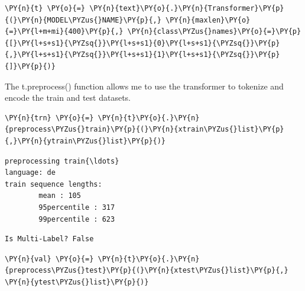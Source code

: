     \begin{tcolorbox}[breakable, size=fbox, boxrule=1pt, pad at break*=1mm,colback=cellbackground, colframe=cellborder]
\begin{Verbatim}[commandchars=\\\{\},fontsize=\footnotesize]
\PY{n}{t} \PY{o}{=} \PY{n}{text}\PY{o}{.}\PY{n}{Transformer}\PY{p}{(}\PY{n}{MODEL\PYZus{}NAME}\PY{p}{,} \PY{n}{maxlen}\PY{o}{=}\PY{l+m+mi}{400}\PY{p}{,} \PY{n}{class\PYZus{}names}\PY{o}{=}\PY{p}{[}\PY{l+s+s1}{\PYZsq{}}\PY{l+s+s1}{0}\PY{l+s+s1}{\PYZsq{}}\PY{p}{,}\PY{l+s+s1}{\PYZsq{}}\PY{l+s+s1}{1}\PY{l+s+s1}{\PYZsq{}}\PY{p}{]}\PY{p}{)}
\end{Verbatim}
\end{tcolorbox}

The t.preprocess() function allows me to use the transformer to tokenize and encode the train and test datasets.
    \begin{tcolorbox}[breakable, size=fbox, boxrule=1pt, pad at break*=1mm,colback=cellbackground, colframe=cellborder]
\begin{Verbatim}[commandchars=\\\{\},fontsize=\footnotesize]
\PY{n}{trn} \PY{o}{=} \PY{n}{t}\PY{o}{.}\PY{n}{preprocess\PYZus{}train}\PY{p}{(}\PY{n}{xtrain\PYZus{}list}\PY{p}{,}\PY{n}{ytrain\PYZus{}list}\PY{p}{)}
\end{Verbatim}
\end{tcolorbox}

    \begin{Verbatim}[commandchars=\\\{\},fontsize=\footnotesize]
preprocessing train{\ldots}
language: de
train sequence lengths:
        mean : 105
        95percentile : 317
        99percentile : 623
    \end{Verbatim}

    \begin{Verbatim}[commandchars=\\\{\},fontsize=\footnotesize]
Is Multi-Label? False
    \end{Verbatim}

    \begin{tcolorbox}[breakable, size=fbox, boxrule=1pt, pad at break*=1mm,colback=cellbackground, colframe=cellborder]
\begin{Verbatim}[commandchars=\\\{\},fontsize=\footnotesize]
\PY{n}{val} \PY{o}{=} \PY{n}{t}\PY{o}{.}\PY{n}{preprocess\PYZus{}test}\PY{p}{(}\PY{n}{xtest\PYZus{}list}\PY{p}{,} \PY{n}{ytest\PYZus{}list}\PY{p}{)}
\end{Verbatim}
\end{tcolorbox}

